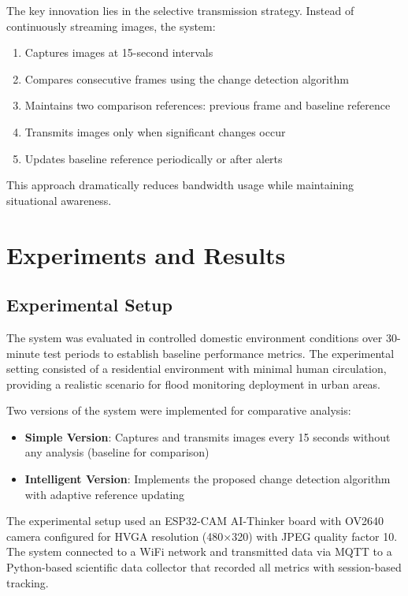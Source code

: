 \documentclass[conference]{IEEEtran}
\begin{document}
The key innovation lies in the selective transmission strategy. Instead of continuously streaming images, the system:
\begin{enumerate}
\item Captures images at 15-second intervals
\item Compares consecutive frames using the change detection algorithm
\item Maintains two comparison references: previous frame and baseline reference
\item Transmits images only when significant changes occur
\item Updates baseline reference periodically or after alerts
\end{enumerate}

This approach dramatically reduces bandwidth usage while maintaining situational awareness.

\section{Experiments and Results}

\subsection{Experimental Setup}

The system was evaluated in controlled domestic environment conditions over 30-minute test periods to establish baseline performance metrics. The experimental setting consisted of a residential environment with minimal human circulation, providing a realistic scenario for flood monitoring deployment in urban areas.

Two versions of the system were implemented for comparative analysis:

\begin{itemize}
\item \textbf{Simple Version}: Captures and transmits images every 15 seconds without any analysis (baseline for comparison)
\item \textbf{Intelligent Version}: Implements the proposed change detection algorithm with adaptive reference updating
\end{itemize}

The experimental setup used an ESP32-CAM AI-Thinker board with OV2640 camera configured for HVGA resolution (480×320) with JPEG quality factor 10. The system connected to a WiFi network and transmitted data via MQTT to a Python-based scientific data collector that recorded all metrics with session-based tracking.
\end{document}

